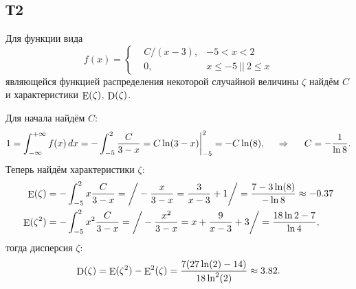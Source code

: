 \subsection*{Т2}


Для функции вида
\begin{equation*}
    f(x) = \left\{\begin{aligned}
        &C/(x-3),  &-5 < x < 2 \\
        &0,     &x \leq -5 \ || \  2 \leq x
    \end{aligned}\right.
\end{equation*}
являющейся функцией распределения некоторой случайной величины $\zeta$ найдём $C$ и характеристики $\mathop{\mathrm{E}}\nolimits(\zeta)$, $\mathop{\mathrm{D}}\nolimits(\zeta)$. 

Для начала найдём $C$:
\begin{equation*}
    1 = \int_{-\infty}^{+\infty} f(x) \, d x = -\int_{-5}^{2} \frac{C}{3-x} = C \ln(3-x) \bigg|_{-5}^2 = -C \ln(8),
    \hspace{0.5cm} \Rightarrow \hspace{0.5cm}
    C = - \frac{1}{\ln 8}.
\end{equation*}
Теперь найдём характеристики $\zeta$:
\begin{align*}
    \mathop{\mathrm{E}}\nolimits(\zeta) &= -\int_{-5}^{2} x \frac{C}{3-x} =
\bigg/
    -\frac{x}{3-x}=\frac{3}{x-3}+1
\bigg/ = 
     \frac{7 - 3 \ln(8)}{-\ln 8} \approx -0.37 \\
    \mathop{\mathrm{E}}\nolimits(\zeta^2) &= -\int_{-5}^{2} x^2 \frac{C}{3-x} = 
\bigg/
    -\frac{x^2}{3-x} = x+\frac{9}{x-3}+3
\bigg/
    =
    \frac{18 \ln 2 - 7}{\ln 4},
\end{align*}
тогда дисперсия $\zeta$:
\begin{equation*}
    \mathop{\mathrm{D}}\nolimits(\zeta) = \mathop{\mathrm{E}}\nolimits(\zeta^2) - \mathop{\mathrm{E}}\nolimits^2(\zeta) = \frac{7 (27 \ln (2)-14)}{18 \ln ^2(2)} \approx 3.82.
\end{equation*}